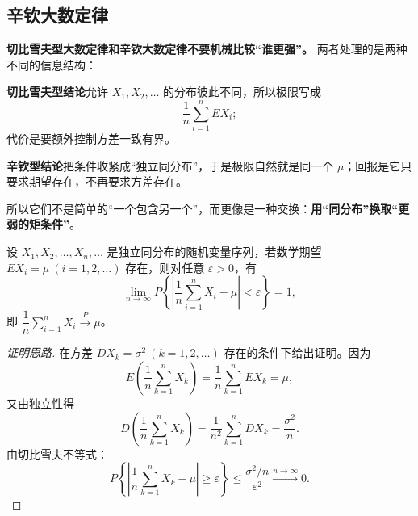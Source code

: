 ﻿\documentclass[lang=cn,11pt]{elegantbook}
\begin{document}
\subsection{辛钦大数定律}

\begin{note}
\textbf{切比雪夫型大数定律和辛钦大数定律不要机械比较“谁更强”。} 两者处理的是两种不同的信息结构：

\textbf{切比雪夫型结论}允许 \(X_1,X_2,\dots\) 的分布彼此不同，所以极限写成
\[
\frac1n\sum_{i=1}^n EX_i;
\]
代价是要额外控制方差一致有界。

\textbf{辛钦型结论}把条件收紧成“独立同分布”，于是极限自然就是同一个 \(\mu\)；回报是它只要求期望存在，不再要求方差存在。

所以它们不是简单的“一个包含另一个”，而更像是一种交换：\textbf{用“同分布”换取“更弱的矩条件”}。
\end{note}

\begin{theorem}[辛钦大数定律] \label{thm:khinchin-lln}
设 \(X_1, X_2, \dots, X_n, \dots\) 是独立同分布的随机变量序列，若数学期望 \(EX_i = \mu\ (i = 1, 2, \dots)\) 存在，则对任意 \(\varepsilon > 0\)，有
\[
\lim_{n\to\infty} P\!\left\{\left|\frac{1}{n}\sum_{i=1}^{n} X_i - \mu\right| < \varepsilon\right\} = 1,
\]
即 \(\dfrac{1}{n}\displaystyle\sum_{i=1}^{n} X_i \stackrel{P}{\longrightarrow} \mu\)。
\end{theorem}

\begin{proof}[证明思路]
在方差 \(DX_k = \sigma^2\ (k=1,2,\dots)\) 存在的条件下给出证明。因为
\[
E\!\left(\frac{1}{n}\sum_{k=1}^{n} X_k\right) = \frac{1}{n}\sum_{k=1}^{n} EX_k = \mu,
\]
又由独立性得
\[
D\!\left(\frac{1}{n}\sum_{k=1}^{n} X_k\right) = \frac{1}{n^2}\sum_{k=1}^{n} DX_k = \frac{\sigma^2}{n}.
\]
由切比雪夫不等式：
\[
P\!\left\{\left|\frac{1}{n}\sum_{k=1}^{n} X_k - \mu\right| \geq \varepsilon\right\}
\leq \frac{\sigma^2/n}{\varepsilon^2} \xrightarrow{n\to\infty} 0.
\]
\end{proof}
\end{document}

